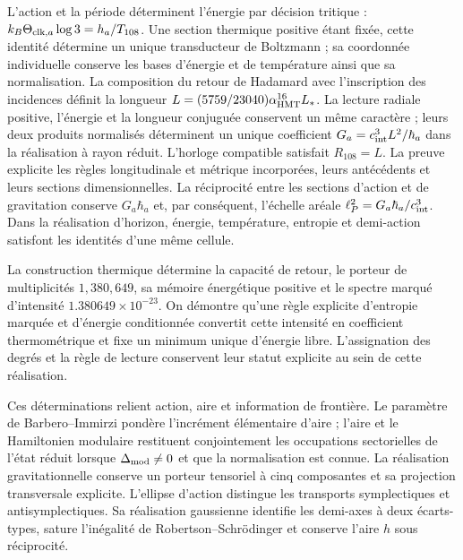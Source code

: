 L'action et la période déterminent l'énergie par décision tritique :
\(k_B\Theta_{{\rm clk},a}\log3=h_a/T_{108}\).
Une section thermique positive étant fixée, cette identité détermine un unique
transducteur de Boltzmann ; sa coordonnée individuelle conserve les bases
d'énergie et de température ainsi que sa normalisation. La composition du retour
de Hadamard avec l'inscription des incidences définit la longueur
\(L=(5759/23040)\alpha_{\mathrm{HMT}}^{16}L_*\). La lecture radiale positive,
l'énergie et la longueur conjuguée conservent un même caractère ; leurs
deux produits normalisés déterminent un unique coefficient
\(G_a=c_{\rm int}^3L^2/\hbar_a\) dans la réalisation à rayon réduit.
L'horloge compatible satisfait \(R_{108}=L\). La preuve explicite les
règles longitudinale et métrique incorporées, leurs antécédents et leurs
sections dimensionnelles.
La réciprocité entre les sections d'action et de gravitation conserve
\(G_a\hbar_a\) et, par conséquent, l'échelle aréale
\(\ell_P^2=G_a\hbar_a/c_{\rm int}^3\).
Dans la réalisation d'horizon, énergie, température, entropie et demi-action
satisfont les identités d'une même cellule.

La construction thermique détermine la capacité de retour, le porteur de
multiplicités \(1,380,649\), sa mémoire énergétique positive et le
spectre marqué d'intensité \(1.380649\times10^{-23}\). On démontre
qu'une règle explicite d'entropie marquée et d'énergie conditionnée
convertit cette intensité en coefficient thermométrique et fixe un minimum
unique d'énergie libre. L'assignation des degrés et la règle de lecture
conservent leur statut explicite au sein de cette réalisation.

Ces déterminations relient action, aire et information de frontière.
Le paramètre de Barbero--Immirzi pondère l'incrément élémentaire d'aire ;
l'aire et le Hamiltonien modulaire restituent conjointement les occupations
sectorielles de l'état réduit lorsque \(\Delta_{\rm mod}\ne0\) et que
la normalisation est connue. La réalisation gravitationnelle conserve un
porteur tensoriel à cinq composantes et sa projection transversale
explicite. L'ellipse d'action distingue les transports symplectiques et
antisymplectiques. Sa réalisation gaussienne identifie les demi-axes à deux
écarts-types, sature l'inégalité de Robertson--Schrödinger et
conserve l'aire \(h\) sous réciprocité.

